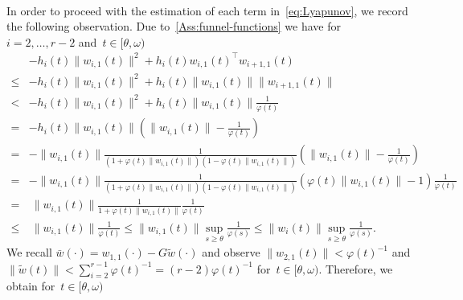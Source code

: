 \documentclass[ envcountsect, envcountsame]{svjour3}
\newcommand{\vp}{\varphi}
\begin{document}
\ \\
In order to proceed with the estimation of each term in~\eqref{eq:Lyapunov}, we record the following observation. 
%
Due to~\ref{Ass:funnel-functions} we have for $i=2,\ldots,r-2$ and~$t \in [\theta,\omega)$
%
\begin{equation} \label{eq:estimate_hi-wi1}
\begin{aligned}
& - h_{i}(t) \|w_{i,1}(t)\|^2 + h_i(t)w_{i,1}(t)^\top w_{i+1,1}(t) \\
 \le & - h_{i}(t) \|w_{i,1}(t)\|^2 + h_i(t) \|w_{i,1}(t)\| \|w_{i+1,1}(t)\| \\
 < &- h_{i}(t) \|w_{i,1}(t)\|^2 + h_i(t) \|w_{i,1}(t)\| \frac{1}{\vp(t)} \\
 = &- h_{i}(t) \|w_{i,1}(t)\| \left( \|w_{i,1}(t)\| - \frac{1}{\vp(t)} \right) \\
= &- \| w_{i,1}(t)\| \frac{1}{(1+\vp(t)\| w_{i,1}(t)\| )(1-\vp(t) \| w_{i,1}(t)\|)} \left( \|w_{i,1}(t)\| - \frac{1}{\vp(t)} \right) \\
= &-\| w_{i,1}(t)\| \frac{1}{(1+\vp(t)\| w_{i,1}(t)\| )(1-\vp(t) \| w_{i,1}(t)\|)} \left( \vp(t) \|w_{i,1}(t)\| - 1 \right) \frac{1}{\vp(t)} \\
= & \ \| w_{i,1}(t)\| \frac{1}{1+\vp(t)\| w_{i,1}(t)\| } \frac{1}{\vp(t)}\\
 \le & \  \| w_{i,1}(t)\| \frac{1}{\vp(t)} \le \| w_{i,1}(t)\| \sup_{s \ge \theta} \frac{1}{\vp(s)} 
 \le \| w_{i}(t)\| \sup_{s \ge \theta} \frac{1}{\vp(s)}.
\end{aligned}
\end{equation}
%
We recall $\bar w(\cdot) = w_{1,1}(\cdot) - G\tilde w(\cdot)$ and observe $\|w_{2,1}(t)\| < \vp(t)^{-1}$ and $\| \tilde w(t) \| < \sum_{i=2}^{r-1}\vp(t)^{-1} = (r-2) \vp(t)^{-1}$ 
for~$t \in [\theta,\omega)$. 
Therefore, we obtain for~$t \in [\theta, \omega)$
\end{document}
